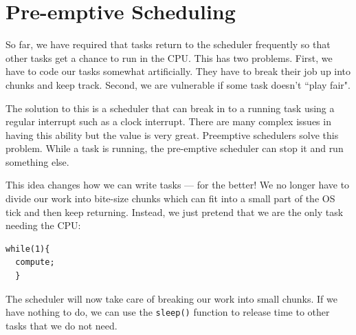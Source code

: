 

\section{Pre-emptive Scheduling}

So far, we have required that tasks return to the scheduler frequently
so that other tasks get a chance to run in the CPU.  This has two
problems.  First, we have to code our tasks somewhat artificially.  They
have to break their job up into chunks and keep track.  Second, we are
vulnerable if some task doesn't ``play fair".

The solution to this is a scheduler that can break in to a running task
using a regular interrupt such as a clock interrupt.   There are many
complex issues in having this ability but the value is very great.
Preemptive schedulers solve this problem.  While a task is running, 
the pre-emptive scheduler can stop it and run something else.

This idea changes how we can write tasks --- for the better! We no longer have to divide our work into bite-size chunks which can fit into a small part of the OS tick and then keep returning.  Instead, we just pretend that we are the only task needing the CPU:
%
%
%

\begin{verbatim}
while(1){
  compute;
  }
\end{verbatim}
The scheduler will now take care of breaking our work into small chunks.  If we have nothing to do, we can use the {\tt sleep()} function to release time to other tasks that we do not need.	%

